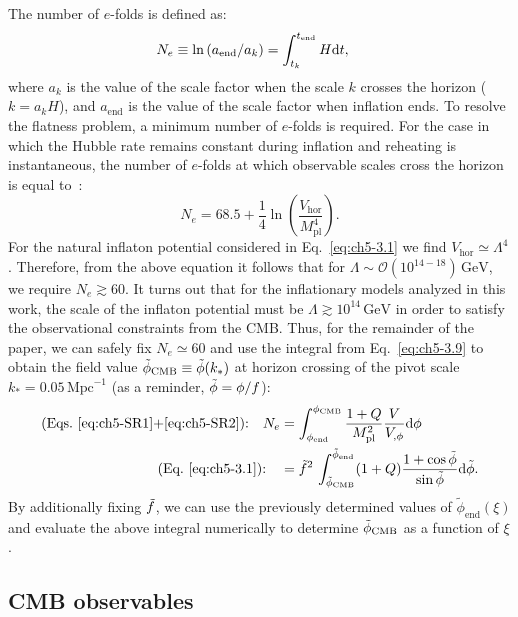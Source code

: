 The number of $e$-folds is defined as:
\begin{align}
    \label{eq:ch5-3.9}
    N_{e} \equiv \ln \left(a_{\mathrm{end}} / a_{k}\right)&=\int^{t_{\mathrm{end}}}_{t_{k}} H {\rm d} t,
\end{align}
where $a_k$ is the value of the scale factor when the scale $k$ crosses the horizon ($k=a_k H$), and $a_\mathrm{end}$ is the value of the scale factor when inflation ends. To resolve the flatness problem, a minimum number of $e$-folds is required. For the case in which the Hubble rate remains constant during inflation and reheating is instantaneous, the number of $e$-folds at which observable scales cross the horizon is equal to~\cite{Liddle:2003as}:
\begin{equation}
    N_{e}=68.5 +\frac{1}{4}\ln\left(\frac{V_{\mathrm{hor}}}{M_{\mathrm{pl}}^4}\right) .
\end{equation}
For the natural inflaton potential considered in Eq.~\ref{eq:ch5-3.1} we find $V_{\mathrm{hor}}\simeq \Lambda^4$. Therefore, from the above equation it follows that for $\Lambda\sim\mathcal{O}(10^{14-18})\,\mathrm{GeV}$, we require $N_e\gtrsim 60$. It turns out that for the inflationary models analyzed in this work, the scale of the inflaton potential must be $\Lambda \gtrsim 10^{14}\,\mathrm{GeV}$ in order to satisfy the observational constraints from the CMB. Thus, for the remainder of the paper, we can safely fix $N_e\simeq 60$ and use the integral from Eq.~\ref{eq:ch5-3.9} to obtain the field value $\Tilde{\phi}_{\mathrm{CMB}}\equiv \Tilde{\phi}(k_*) $ at horizon
crossing of the pivot scale $k_* = 0.05\,\mathrm{Mpc}^{-1}$ (as a reminder, $\Tilde{\phi} = \phi/f$):
\begin{align}
\text{(Eqs.~\ref{eq:ch5-SR1}+\ref{eq:ch5-SR2}):} \quad N_e &=\int_{\phi_{\mathrm{end }}}^{\phi_{\mathrm{CMB}}} \frac{1+Q}{M_{\mathrm{pl}}^{2}} \frac{V}{V_{, \phi}} {\rm d} \phi \\
\text{(Eq.~\ref{eq:ch5-3.1}):} \quad &=\Tilde{f}^2\,\int_{\Tilde{\phi}_{\mathrm{CMB}}}^{\Tilde{\phi}_{\mathrm{end}}} (1+Q) \frac{1+\cos \Tilde{\phi}}{\sin \Tilde{\phi}} {\rm d} \Tilde{\phi}.
\end{align}
By additionally fixing $\Tilde{f}$, we can use the previously determined values of $\tilde{\phi}_{\mathrm{end}}(\xi)$ and evaluate the above integral numerically to determine $\Tilde{\phi}_{\mathrm{CMB}}$ as a function of $\xi$.

\subsection{CMB observables}
\label{sec:ch5-3.3}

